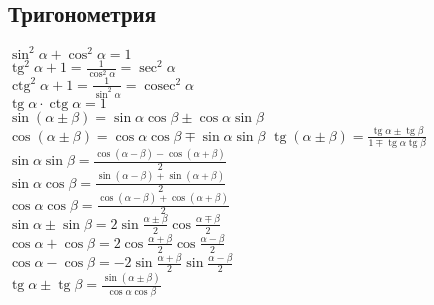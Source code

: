 \documentclass[a4paper]{article}
\begin{document}
\begin{multicols*}{2}
		 \subsection{Тригонометрия}
		 $\operatorname {sin}^{2}\alpha +\operatorname {cos}^{2}\alpha =1$ \\
		 $\operatorname {tg}^{2}\alpha +1={\frac {1}{\cos ^{2}\alpha }}=\operatorname {sec}^{2}\alpha $ \\
		 $\operatorname {ctg}^{2}\alpha +1={\frac {1}{\sin ^{2}\alpha }}=\operatorname {cosec}^{2}\alpha $ \\
		 ${\displaystyle \operatorname {tg} \alpha \cdot \operatorname {ctg} \alpha =1}$ \\
		 $\sin \left(\alpha \pm \beta \right)=\sin \alpha \cos \beta \pm \cos \alpha \sin \beta $\\
		 $\cos \left(\alpha \pm \beta \right)=\cos \alpha \cos \beta \mp \sin \alpha \sin \beta $
		 $\operatorname {tg}\left(\alpha \pm \beta \right)={\frac {\operatorname {tg}\alpha \pm \operatorname {tg}\beta }{1\mp \operatorname {tg}\alpha \operatorname {tg}\beta }}$ \\
		 $\sin \alpha \sin \beta ={\frac {\cos(\alpha -\beta )-\cos(\alpha +\beta )}{2}}$\\
		 $\sin \alpha \cos \beta ={\frac {\sin(\alpha -\beta )+\sin(\alpha +\beta )}{2}}$\\
		 $\cos \alpha \cos \beta ={\frac {\cos(\alpha -\beta )+\cos(\alpha +\beta )}{2}}$\\
		 $\sin \alpha \pm \sin \beta =2\sin {\frac {\alpha \pm \beta }{2}}\cos {\frac {\alpha \mp \beta }{2}}$ \\
		 $\cos \alpha +\cos \beta =2\cos {\frac {\alpha +\beta }{2}}\cos {\frac {\alpha -\beta }{2}}$ \\
		 $\cos \alpha -\cos \beta =-2\sin {\frac {\alpha +\beta }{2}}\sin {\frac {\alpha -\beta }{2}}$\\
		 $\operatorname {tg}\alpha \pm \operatorname {tg}\beta ={\frac {\sin(\alpha \pm \beta )}{\cos \alpha \cos \beta }}$ \\
	\end{multicols*}
\end{document}
